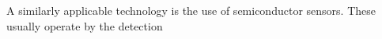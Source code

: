 A similarly applicable technology is the use of semiconductor sensors.
These usually operate by the detection 






